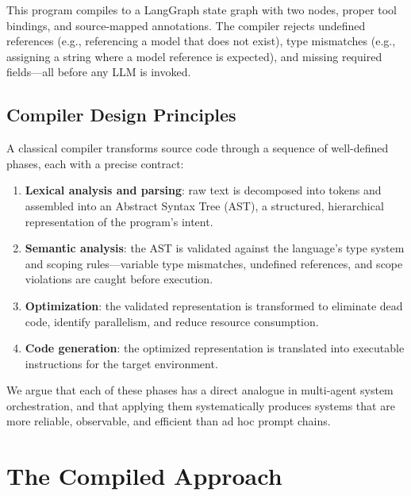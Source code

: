 \documentclass[sigconf,nonacm]{acmart}
\begin{document}
This program compiles to a LangGraph state graph with two nodes, proper
tool bindings, and source-mapped annotations. The compiler rejects
undefined references (e.g., referencing a model that does not exist),
type mismatches (e.g., assigning a string where a model reference is
expected), and missing required fields---all before any LLM is invoked.

\subsection{Compiler Design Principles}
\label{sec:background:compiler}

A classical compiler transforms source code through a sequence of
well-defined phases, each with a precise contract:

\begin{enumerate}[leftmargin=*]
  \item \textbf{Lexical analysis and parsing}: raw text is decomposed
        into tokens and assembled into an Abstract Syntax Tree (AST), a
        structured, hierarchical representation of the program's intent.
  \item \textbf{Semantic analysis}: the AST is validated against the
        language's type system and scoping rules---variable type
        mismatches, undefined references, and scope violations are
        caught before execution.
  \item \textbf{Optimization}: the validated representation is
        transformed to eliminate dead code, identify parallelism, and
        reduce resource consumption.
  \item \textbf{Code generation}: the optimized representation is
        translated into executable instructions for the target
        environment.
\end{enumerate}

We argue that each of these phases has a direct analogue in multi-agent
system orchestration, and that applying them systematically produces
systems that are more reliable, observable, and efficient than ad hoc
prompt chains.

\section{The Compiled Approach}
\label{sec:architecture}
\end{document}
